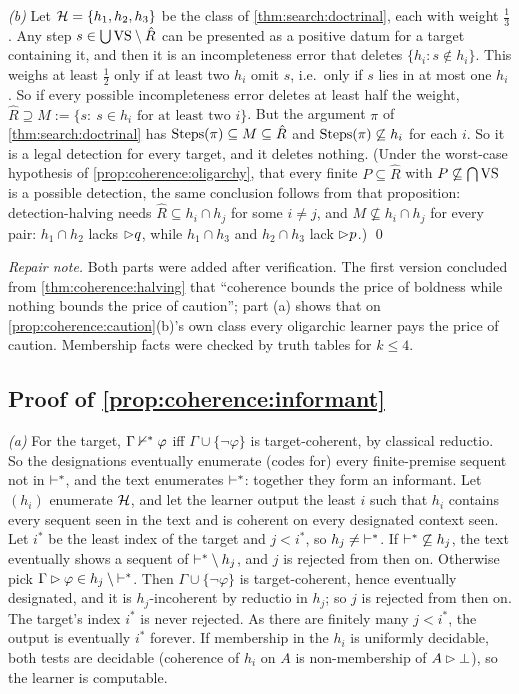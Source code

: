 \emph{(b)} Let $\mathcal{H}=\{h_1,h_2,h_3\}$ be the class of \cref{thm:search:doctrinal}, each with weight $\frac13$. Any step $s\in\bigcup\mathrm{VS}\setminus\hat R$ can be presented as a positive datum for a target containing it, and then it is an incompleteness error that deletes $\{h_i:s\notin h_i\}$. This weighs at least $\frac12$ only if at least two $h_i$ omit $s$, i.e.\ only if $s$ lies in at most one $h_i$. So if every possible incompleteness error deletes at least half the weight, $\hat R\supseteq M:=\{s:\ s\in h_i\text{ for at least two }i\}$. But the argument $\pi$ of \cref{thm:search:doctrinal} has $\mathrm{Steps}(\pi)\subseteq M\subseteq\hat R$ and $\mathrm{Steps}(\pi)\not\subseteq h_i$ for each $i$. So it is a legal detection for every target, and it deletes nothing. (Under the worst-case hypothesis of \cref{prop:coherence:oligarchy}, that every finite $P\subseteq\hat R$ with $P\not\subseteq\bigcap\mathrm{VS}$ is a possible detection, the same conclusion follows from that proposition: detection-halving needs $\hat R\subseteq h_i\cap h_j$ for some $i\neq j$, and $M\not\subseteq h_i\cap h_j$ for every pair: $h_1\cap h_2$ lacks $\rhd q$, while $h_1\cap h_3$ and $h_2\cap h_3$ lack $\rhd p$.) \qed

\emph{Repair note.} Both parts were added after verification. The first version concluded from \cref{thm:coherence:halving} that ``coherence bounds the price of boldness while nothing bounds the price of caution''; part (a) shows that on \cref{prop:coherence:caution}(b)'s own class every oligarchic learner pays the price of caution. Membership facts were checked by truth tables for $k\le4$.

\subsection{Proof of \texorpdfstring{\cref{prop:coherence:informant}}{the informant proposition}}\label{app:coherence:informant}

\emph{(a)} For the target, $\Gamma\nvdash^*\varphi$ iff $\Gamma\cup\{\neg\varphi\}$ is target-coherent, by classical reductio. So the designations eventually enumerate (codes for) every finite-premise sequent not in $\vdash^{*}$, and the text enumerates $\vdash^{*}$: together they form an informant. Let $(h_i)$ enumerate $\mathcal{H}$, and let the learner output the least $i$ such that $h_i$ contains every sequent seen in the text and is coherent on every designated context seen. Let $i^*$ be the least index of the target and $j<i^*$, so $h_j\neq{\vdash^{*}}$. If ${\vdash^{*}}\not\subseteq h_j$, the text eventually shows a sequent of ${\vdash^{*}}\setminus h_j$, and $j$ is rejected from then on. Otherwise pick $\Gamma\rhd\varphi\in h_j\setminus{\vdash^{*}}$. Then $\Gamma\cup\{\neg\varphi\}$ is target-coherent, hence eventually designated, and it is $h_j$-incoherent by reductio in $h_j$; so $j$ is rejected from then on. The target's index $i^*$ is never rejected. As there are finitely many $j<i^*$, the output is eventually $i^*$ forever. If membership in the $h_i$ is uniformly decidable, both tests are decidable (coherence of $h_i$ on $A$ is non-membership of $A\rhd\bot$), so the learner is computable.

